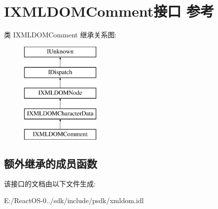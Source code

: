 \hypertarget{interface_i_x_m_l_d_o_m_comment}{}\section{I\+X\+M\+L\+D\+O\+M\+Comment接口 参考}
\label{interface_i_x_m_l_d_o_m_comment}
类 I\+X\+M\+L\+D\+O\+M\+Comment 继承关系图\+:\begin{figure}[H]
\begin{center}
\leavevmode
\includegraphics[height=5.000000cm]{interface_i_x_m_l_d_o_m_comment}
\end{center}
\end{figure}
\subsection*{额外继承的成员函数}


该接口的文档由以下文件生成\+:\begin{DoxyCompactItemize}
\item 
E\+:/\+React\+O\+S-\/0../sdk/include/psdk/xmldom.\+idl\end{DoxyCompactItemize}
